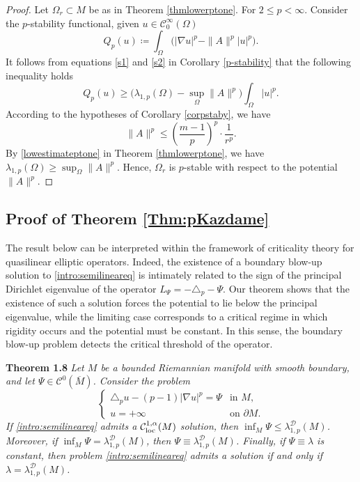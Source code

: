 \documentclass{article}
\begin{document}
\begin{proof}
Let $\Omega_r \subset M$ be as in Theorem \ref{thmlowerptone}.
For $2 \le p < \infty$. Consider the $p$-stability functional, given $u \in \mathcal{C}_0^\infty(\Omega)$
\begin{equation*}
    Q_p(u) \coloneq \int_{\Omega} \Big( |\nabla u|^p - \|A\|^p |u|^p \Big).
\end{equation*} 
It follows from equations \eqref{s1} and \eqref{s2} in Corollary \ref{p-stability} that the following inequality holds
\[
Q_p(u) \geq \big( \lambda_{1,p}(\Omega) - \sup_{\Omega} \|A\|^p\big)
\int_{\Omega} |u|^p.
\]
According to the hypotheses of Corollary \ref{corpstaby}, we have
\begin{equation*}
     \|A\|^{p} \leq \left( \frac{m-1}{p} \right)^{p} \cdot \frac{1}{r^p}.
\end{equation*}
By \eqref{lowestimateptone} in Theorem \ref{thmlowerptone}, we have $\lambda_{1,p}(\Omega) \ge \sup_{\Omega} \|A\|^{p}$. Hence, $\Omega_r$ is $p$-stable with respect to the potential $\|A\|^{p}$.
\end{proof}

\subsection{Proof of Theorem \ref{Thm:pKazdame}}

The result below can be interpreted within the framework of criticality theory for quasilinear elliptic operators. Indeed, the existence of a boundary blow-up solution to \eqref{intro:semilineareq} is intimately related to the sign of the principal Dirichlet eigenvalue of the operator $L_\Psi = -\triangle_p - \Psi$. Our theorem shows that the existence of such a solution forces the potential to lie below the principal eigenvalue, while the limiting case corresponds to a critical regime in which rigidity occurs and the potential must be constant. In this sense, the boundary blow-up problem detects the critical threshold of the operator.
\medskip

\noindent
\textbf{Theorem 1.8}
\textit{Let $M$ be a bounded Riemannian manifold with smooth boundary, and let 
$\Psi \in \mathcal{C}^0(\overline{M})$. Consider the problem
\begin{equation}\label{intro:semilineareq}
\begin{cases}
\triangle_p u - (p-1)|\nabla u|^p = \Psi & \text{in } M,\\
u = +\infty & \text{on } \partial M.
\end{cases}
\end{equation}
If \eqref{intro:semilineareq} admits a $\mathcal{C}^{1,\alpha}_{{\rm loc}}(M)$ solution, then $\inf_M \Psi \leq \lambda_{1,p}^{\mathcal{D}}(M)$. Moreover, if $\inf_M \Psi = \lambda_{1,p}^{\mathcal{D}}(M)$, then $\Psi \equiv \lambda_{1,p}^{\mathcal{D}}(M)$. Finally, if $\Psi \equiv \lambda$ is constant, then problem \eqref{intro:semilineareq} admits a solution if and only if $\lambda = \lambda_{1,p}^{\mathcal{D}}(M)$.}
\end{document}
